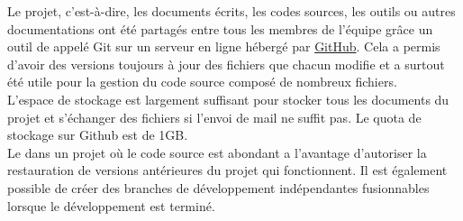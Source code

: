 
Le projet, c'est-à-dire, les documents écrits, les codes sources, les outils ou autres documentations ont été partagés entre tous les membres de l'équipe grâce un outil de  appelé Git sur un serveur en ligne hébergé par \href{https://github.com}{GitHub}. Cela a permis d'avoir des versions toujours à jour des fichiers que chacun modifie et a surtout été utile pour la gestion du code source composé de nombreux fichiers.\\
L'espace de stockage est largement suffisant pour stocker tous les documents du projet et s'échanger des fichiers si l'envoi de mail ne suffit pas. Le quota de stockage sur Github est de 1GB.\\
Le  dans un projet où le code source est abondant a l'avantage d'autoriser la restauration de versions antérieures du projet qui fonctionnent. Il est également possible de créer des branches de développement indépendantes fusionnables lorsque le développement est terminé.